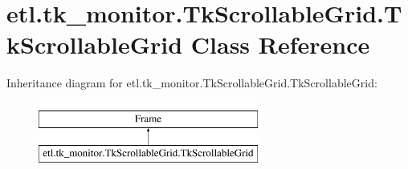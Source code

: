 \hypertarget{classetl_1_1tk__monitor_1_1TkScrollableGrid_1_1TkScrollableGrid}{\section{etl.\-tk\-\_\-monitor.\-Tk\-Scrollable\-Grid.\-Tk\-Scrollable\-Grid Class Reference}
\label{classetl_1_1tk__monitor_1_1TkScrollableGrid_1_1TkScrollableGrid}
}
Inheritance diagram for etl.\-tk\-\_\-monitor.\-Tk\-Scrollable\-Grid.\-Tk\-Scrollable\-Grid\-:\begin{figure}[H]
\begin{center}
\leavevmode
\includegraphics[height=2.000000cm]{classetl_1_1tk__monitor_1_1TkScrollableGrid_1_1TkScrollableGrid}
\end{center}
\end{figure}
